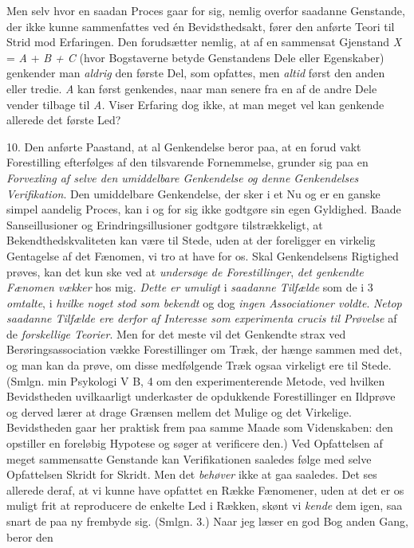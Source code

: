 \documentclass[12pt,a4paper,openany]{book}
\begin{document}
Men selv hvor en saadan Proces gaar for sig, nemlig overfor saadanne Genstande,
der ikke kunne sammenfattes ved én Bevidsthedsakt, fører den anførte Teori til
Strid mod Erfaringen. Den forudsætter nemlig, at af en sammensat Gjenstand
\textit{X} = \textit{A} + \textit{B + C} (hvor Bogstaverne betyde Genstandens
Dele eller Egenskaber) genkender man \emph{aldrig} den første Del, som
opfattes, men \emph{altid} først den anden eller tredie. \textit{A} kan først
genkendes, naar man senere fra en af de andre Dele vender tilbage til
\textit{A.} Viser Erfaring dog ikke, at man meget vel kan genkende allerede det
første Led?

10. Den anførte Paastand, at al Genkendelse beror paa, at en forud vakt
Forestilling efterfølges af den tilsvarende Fornemmelse, grunder sig paa en
\emph{Forvexling af selve den umiddelbare Genkendelse og denne Genkendelses
Verifikation}. Den umiddelbare Genkendelse, der sker i et Nu og er en ganske
simpel aandelig Proces, kan i og for sig ikke godtgøre sin egen Gyldighed.
Baade Sanseillusioner og Erindringsillusioner godtgøre tilstrækkeligt, at
Bekendthedskvaliteten kan være til Stede, uden at der foreligger en virkelig
Gentagelse af det Fænomen, vi tro at have for os. Skal Genkendelsens Rigtighed
prøves, kan det kun ske ved at \emph{undersøge de Forestillinger}, \emph{det
genkendte Fænomen vækker} hos mig. \emph{Dette er umuligt} i \emph{saadanne
Tilfælde} som de i 3 \emph{omtalte}, i \emph{hvilke noget stod som bekendt} og
dog \emph{ingen Associationer voldte}. \emph{Netop saadanne Tilfælde ere derfor
af Interesse som experimenta crucis til Prøvelse} af de \emph{forskellige
Teorier}. Men for det meste vil det Genkendte strax ved Berøringsassociation
vække Forestillinger om Træk, der hænge sammen med det, og man kan da prøve, om
disse medfølgende Træk ogsaa virkeligt ere til Stede. (Smlgn. min Psykologi V
B, 4 om den experimenterende Metode, ved hvilken Bevidstheden uvilkaarligt
underkaster de opdukkende Forestillinger en Ildprøve og derved lærer at drage
Grænsen mellem det Mulige og det Virkelige. Bevidstheden gaar her praktisk frem
paa samme Maade som Videnskaben: den opstiller en foreløbig Hypotese og søger
at verificere den.) Ved Opfattelsen af meget sammensatte Genstande kan
Verifikationen saaledes følge med selve Opfattelsen Skridt for Skridt. Men det
\emph{behøver} ikke at gaa saaledes. Det ses allerede deraf, at vi kunne have
opfattet en Række Fænomener, uden at det er os muligt frit at reproducere de
enkelte Led i Rækken, skønt vi \emph{kende} dem igen, saa snart de paa ny
frembyde sig. (Smlgn. 3.) Naar jeg læser en god Bog anden Gang, beror den
\end{document}
